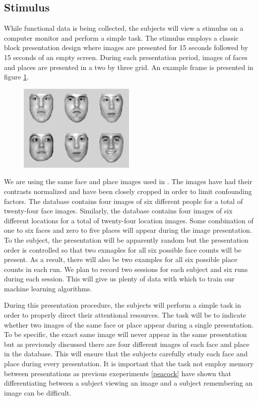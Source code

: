 \documentclass[12pt]{article}
\begin{document}
\subsection{Stimulus}
While functional data is being collected, the subjects will view a stimulus on a computer monitor and perform a simple task.
The stimulus employs a classic block presentation design where images are presented for 15 seconds followed by 15 seconds of an empty screen.
During each presentation period, images of faces and places are presented in a two by three grid.
An example frame is presented in figure \ref{fig:stimulus-frame}.
\begin{figure}
\centering
\includegraphics[width=0.5\textwidth]{figures/stimulus-frame}
\caption{}
\label{fig:stimulus-frame}
\end{figure}
We are using the same face and place images used in \cite{Haxby2001}.
The images have had their contrasts normalized and have been closely cropped in order to limit confounding factors.
The database contains four images of six different people for a total of twenty-four face images.
Similarly, the database contains four images of six different locations for a total of twenty-four location images.
Some combination of one to six faces and zero to five places will appear during the image presentation.
To the subject, the presentation will be apparently random but the presentation order is controlled so that two exmaples for all six possible face counts will be present.
As a result, there will also be two examples for all six possible place counts in each run.
We plan to record two sessions for each subject and six runs during each session.
This will give us plenty of data with which to train our machine learning algorithms.

During this presentation procedure, the subjects will perform a simple task in order to properly direct their attentional resources.
The task will be to indicate whether two images of the same face or place appear during a single presentation.
To be specific, the exact same image will never appear in the same presentation but as previously discussed there are four different images of each face and place in the database.
This will ensure that the subjects carefully study each face and place during every presentation.
It is important that the task not employ memory between presentations as previous exeperiments \ref{peacock} have shown that differentiating between a subject viewing an image and a subject remembering an image can be difficult.
\end{document}
